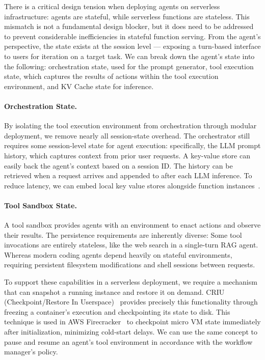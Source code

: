 There is a critical design tension when deploying agents on serverless infrastructure: agents are stateful, while serverless functions are stateless.
This mismatch is not a fundamental design blocker, but it does need to be addressed to prevent considerable inefficiencies in stateful function serving.
From the agent's perspective, the state exists at the session level --- exposing a turn-based interface to users for iteration on a target task.
We can break down the agent's state into the following: orchestration state, used for the prompt generator, tool execution state, which captures the results of actions within the tool execution environment, and KV Cache state for inference.

\paragraph{Orchestration State.}
By isolating the tool execution environment from orchestration through modular deployment, we remove nearly all session-state overhead.
The orchestrator still requires some session-level state for agent execution: specifically, the LLM prompt history, which captures context from prior user requests.
A key-value store can easily back the agent's context based on a session ID.
The history can be retrieved when a request arrives and appended to after each LLM inference.
To reduce latency, we can embed local key value stores alongside function instances~\cite{cloudburstberkeley}.

\paragraph{Tool Sandbox State.}
A tool sandbox provides agents with an environment to enact actions and observe their results. 
The persistence requirements are inherently diverse: 
Some tool invocations are entirely stateless, like the web search in a single-turn RAG agent.
Whereas modern coding agents depend heavily on stateful environments, requiring persistent filesystem modifications and shell sessions between requests.

To support these capabilities in a serverless deployment, we require a mechanism that can snapshot a running instance and restore it on demand.
CRIU (Checkpoint/Restore In Userspace)~\cite{CRIU} provides precisely this functionality through freezing a container's execution and checkpointing its state to disk.
This technique is used in AWS Firecracker~\cite{firecracker} to checkpoint micro VM state immediately after initialization, minimizing cold-start delays.
We can use the same concept to pause and resume an agent's tool environment in accordance with the workflow manager's policy.

